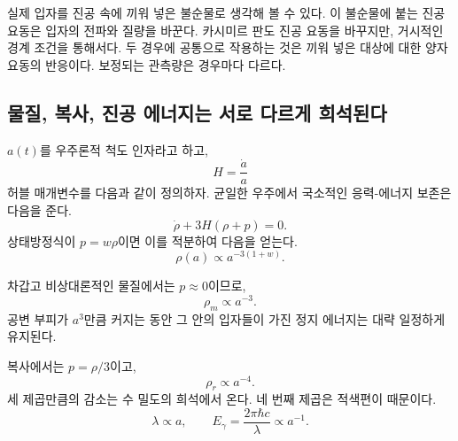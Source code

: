 실제 입자를 진공 속에 끼워 넣은 불순물로 생각해 볼 수 있다. 이 불순물에 붙는 진공 요동은 입자의 전파와 질량을 바꾼다. 카시미르 판도 진공 요동을 바꾸지만, 거시적인 경계 조건을 통해서다. 두 경우에 공통으로 작용하는 것은 끼워 넣은 대상에 대한 양자 요동의 반응이다. 보정되는 관측량은 경우마다 다르다.

\vspace{-2pt}\subsection{물질, 복사, 진공 에너지는 서로 다르게 희석된다}

\(a(t)\)를 우주론적 척도 인자라고 하고,
\begin{equation}
H=\frac{\dot a}{a}
\end{equation}
허블 매개변수를 다음과 같이 정의하자. 균일한 우주에서 국소적인 응력-에너지 보존은 다음을 준다.
\begin{equation}
\dot\rho+3H(\rho+p)=0.
\end{equation}
상태방정식이 \(p=w\rho\)이면 이를 적분하여 다음을 얻는다.
\begin{equation}
\rho(a)\propto a^{-3(1+w)}.
\end{equation}

차갑고 비상대론적인 물질에서는 \(p\approx0\)이므로,
\begin{equation}
\rho_m\propto a^{-3}.
\end{equation}
공변 부피가 \(a^3\)만큼 커지는 동안 그 안의 입자들이 가진 정지 에너지는 대략 일정하게 유지된다.

복사에서는 \(p=\rho/3\)이고,
\begin{equation}
\rho_r\propto a^{-4}.
\end{equation}
세 제곱만큼의 감소는 수 밀도의 희석에서 온다. 네 번째 제곱은 적색편이 때문이다.
\begin{equation}
\lambda\propto a,
\qquad
E_\gamma=\frac{2\pi\hbar c}{\lambda}\propto a^{-1}.
\end{equation}

\begin{classroomqa}
\end{classroomqa}

